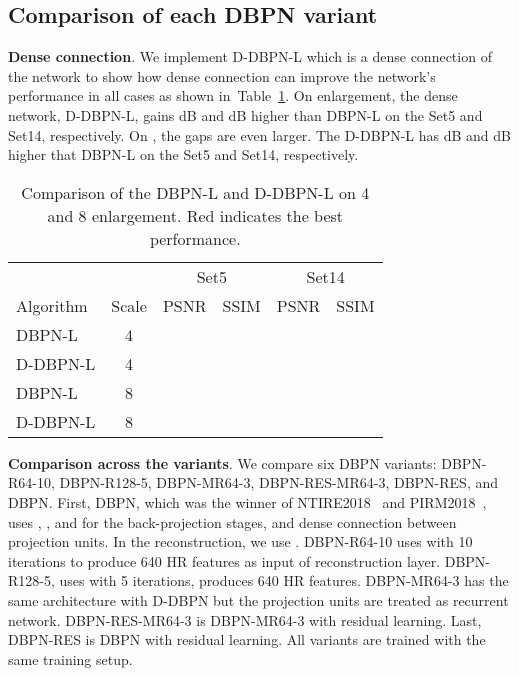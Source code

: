 \documentclass[10pt,journal,compsoc]{IEEEtran}
\begin{document}
\subsection{Comparison of each DBPN variant}
\noindent \textbf{Dense connection}. We implement D-DBPN-L which is a dense connection of the  network to show how dense connection can improve the network's performance in all cases as shown in~Table~\ref{tab:dense}. On  enlargement, the dense network, D-DBPN-L, gains  dB and  dB higher than DBPN-L on the Set5 and Set14, respectively. On , the gaps are even larger. The D-DBPN-L has  dB and  dB higher that DBPN-L on the Set5 and Set14, respectively.
\begin{table}[t!]
\small
\caption{Comparison of the DBPN-L and D-DBPN-L on 4 and 8 enlargement. {\color{red}Red} indicates the best performance.}
\centering
\label{tab:dense}
\begin{tabular}{*1l*1c|*2c*2c}
\hline
 & &\multicolumn{2}{c}{Set5} & \multicolumn{2}{c}{Set14} \\         
Algorithm & Scale & PSNR&SSIM & PSNR&SSIM   \\
\hline
DBPN-L&4		&&&&\\
D-DBPN-L&4		&{\color{red}}&{\color{red}}&{\color{red}}&{\color{red}}\\
\hline
DBPN-L&8		&&&&\\
D-DBPN-L&8		&{\color{red}}&{\color{red}}&{\color{red}}&{\color{red}}\\
\hline
\end{tabular}
\end{table}

\noindent \textbf{Comparison across the variants}. We compare six DBPN variants: DBPN-R64-10, DBPN-R128-5, DBPN-MR64-3, DBPN-RES-MR64-3, DBPN-RES, and DBPN. 
First, DBPN, which was the winner of NTIRE2018~\cite{timofte2018ntire} and PIRM2018~\cite{pirm2018}, uses , , and  for the back-projection stages, and dense connection between projection units. In the reconstruction, we use . 
DBPN-R64-10 uses  with 10 iterations to produce 640 HR features as input of reconstruction layer.
DBPN-R128-5, uses  with 5 iterations, produces 640 HR features.
DBPN-MR64-3 has the same architecture with D-DBPN but the projection units are treated as recurrent network.
DBPN-RES-MR64-3 is DBPN-MR64-3 with residual learning. 
Last, DBPN-RES is DBPN with residual learning. 
All variants are trained with the same training setup.
\end{document}
